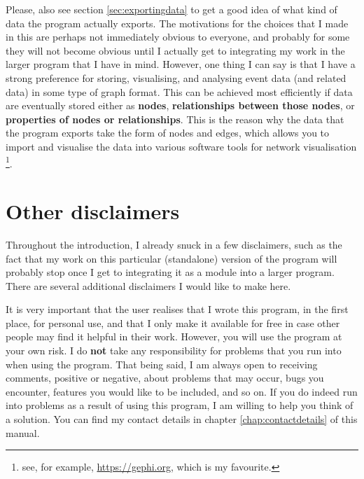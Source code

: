 \documentclass{memoir}
\begin{document}
Please, also see section \ref{sec:exportingdata} to get a good idea of what kind of data the program actually exports. The motivations for the choices that I made in this are perhaps not immediately obvious to everyone, and probably for some they will not become obvious until I actually get to integrating my work in the larger program that I have in mind. However, one thing I can say is that I have a strong preference for storing, visualising, and analysing event data (and related data) in some type of graph format. This can be achieved most efficiently if data are eventually stored either as \textbf{nodes}, \textbf{relationships between those nodes}, or \textbf{properties of nodes or relationships}. This is the reason why the data that the program exports take the form of nodes and edges, which allows you to import and visualise the data into various software tools for network visualisation \footnote{see, for example, \url{https://gephi.org}, which is my favourite.}.  

\section{Other disclaimers}
\label{sec:disclaimers}

Throughout the introduction, I already snuck in a few disclaimers, such as the fact that my work on this particular (standalone) version of the program will probably stop once I get to integrating it as a module into a larger program. There are several additional disclaimers I would like to make here. 

It is very important that the user realises that I wrote this program, in the first place, for personal use, and that I only make it available for free in case other people may find it helpful in their work. However, you will use the program at your own risk. I do \textbf{not} take any responsibility for problems that you run into when using the program. That being said, I am always open to receiving comments, positive or negative, about problems that may occur, bugs you encounter, features you would like to be included, and so on. If you do indeed run into problems as a result of using this program, I am willing to help you think of a solution. You can find my contact details in chapter \ref{chap:contactdetails} of this manual.
\end{document}

